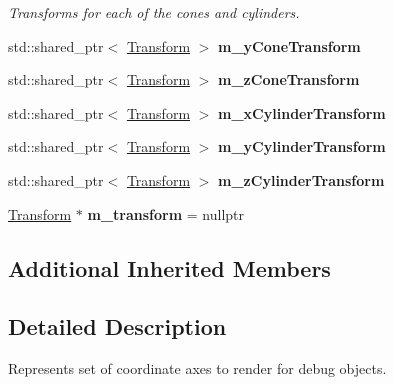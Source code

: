 \begin{Indent}
\begin{DoxyCompactItemize}
\begin{DoxyCompactList}\small\item\em Transforms for each of the cones and cylinders. \end{DoxyCompactList}\item 
\mbox{\label{classrev_1_1_debug_coordinate_axes_abd0fb2139ea50533262df3d665b5ff32}} 
std\+::shared\+\_\+ptr$<$ \mbox{\hyperlink{classrev_1_1_transform}{Transform}} $>$ {\bfseries m\+\_\+y\+Cone\+Transform}
\item 
\mbox{\label{classrev_1_1_debug_coordinate_axes_a5b369fb5becb3a006b1c63686b1af78b}} 
std\+::shared\+\_\+ptr$<$ \mbox{\hyperlink{classrev_1_1_transform}{Transform}} $>$ {\bfseries m\+\_\+z\+Cone\+Transform}
\item 
\mbox{\label{classrev_1_1_debug_coordinate_axes_a38420f84e930a348ee5f8461300adb9c}} 
std\+::shared\+\_\+ptr$<$ \mbox{\hyperlink{classrev_1_1_transform}{Transform}} $>$ {\bfseries m\+\_\+x\+Cylinder\+Transform}
\item 
\mbox{\label{classrev_1_1_debug_coordinate_axes_a0b5a1e7c3be07433673997f177df3533}} 
std\+::shared\+\_\+ptr$<$ \mbox{\hyperlink{classrev_1_1_transform}{Transform}} $>$ {\bfseries m\+\_\+y\+Cylinder\+Transform}
\item 
\mbox{\label{classrev_1_1_debug_coordinate_axes_ae2b417862ddf044e264a9665b6b3eb1f}} 
std\+::shared\+\_\+ptr$<$ \mbox{\hyperlink{classrev_1_1_transform}{Transform}} $>$ {\bfseries m\+\_\+z\+Cylinder\+Transform}
\item 
\mbox{\label{classrev_1_1_debug_coordinate_axes_a7552b6a22dd7cb029c06b53034823acb}} 
\mbox{\hyperlink{classrev_1_1_transform}{Transform}} $\ast$ {\bfseries m\+\_\+transform} = nullptr
\end{DoxyCompactItemize}
\end{Indent}
\subsection*{Additional Inherited Members}


\subsection{Detailed Description}
Represents set of coordinate axes to render for debug objects. 

